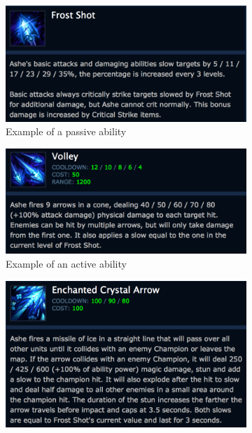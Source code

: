 \begin{figure}[!htb]
        \centering
        \begin{subfigure}[b]{0.49\textwidth}
                \includegraphics[width=\textwidth]{img/frostshot.png}
                \caption{Example of a passive ability}
                \label{fig:frostshot}
        \end{subfigure}
        \begin{subfigure}[b]{0.49\textwidth}
                \includegraphics[width=\textwidth]{img/volley.png}
                \caption{Example of an active ability}
                \label{fig:volley}
        \end{subfigure}
        \begin{subfigure}[b]{0.49\textwidth}
          \includegraphics[width=\textwidth]{img/enchanted.png}

\end{subfigure}
\end{figure}

